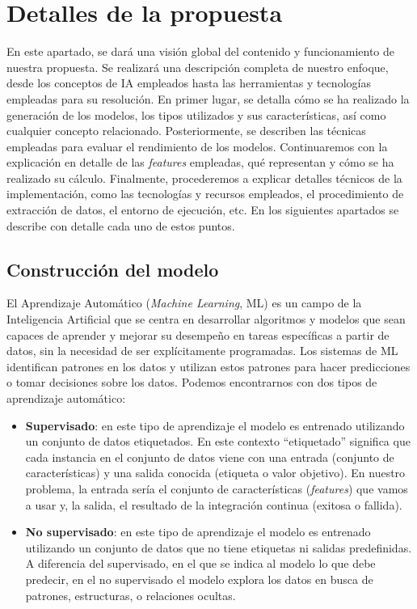 \section{Detalles de la propuesta}
En este apartado, se dará una visión global del contenido y funcionamiento de nuestra propuesta.
Se realizará una descripción completa de nuestro enfoque, desde los conceptos de IA
empleados hasta las herramientas y tecnologías empleadas para su resolución. En primer lugar, se
detalla cómo se ha realizado la generación de los modelos, los tipos utilizados y sus
características, así como cualquier concepto relacionado. Posteriormente, se describen las
técnicas empleadas para evaluar el rendimiento de los modelos. Continuaremos con la explicación
en detalle de las \textit{features} empleadas, qué representan y cómo se ha realizado su cálculo.
Finalmente, procederemos a explicar detalles técnicos de la implementación, como las tecnologías
y recursos empleados, el procedimiento de extracción de datos, el entorno de ejecución, etc. En
los siguientes apartados se describe con detalle cada uno de estos puntos.

\subsection{Construcción del modelo} \label{sec:model_construction}

El Aprendizaje Automático (\textit{Machine Learning}, ML)
es un campo de la Inteligencia Artificial que se centra en desarrollar algoritmos y modelos que
sean capaces de aprender y mejorar su desempeño en tareas específicas a partir de datos, sin la
necesidad de ser explícitamente programadas. Los sistemas de ML identifican patrones en
los datos y utilizan estos patrones para hacer predicciones o tomar decisiones sobre los datos.
Podemos encontrarnos con dos tipos de aprendizaje automático:

\begin{itemize}
	\item \textbf{Supervisado}: en este tipo de aprendizaje el modelo es entrenado utilizando un
    conjunto de datos etiquetados. En este contexto ``etiquetado'' significa que cada instancia
    en el conjunto de datos viene con una entrada (conjunto de características) y una salida
    conocida (etiqueta o valor objetivo). En nuestro problema, la entrada sería el conjunto de
    características (\textit{features}) que vamos a usar y, la salida, el resultado de la
    integración continua (exitosa o fallida).
	\item \textbf{No supervisado}: en este tipo de aprendizaje el modelo es entrenado utilizando
    un conjunto de datos que no tiene etiquetas ni salidas predefinidas. A diferencia del
    supervisado, en el que se indica al modelo lo que debe predecir, en el no supervisado el
    modelo explora los datos en busca de patrones, estructuras, o relaciones ocultas.
\end{itemize}

